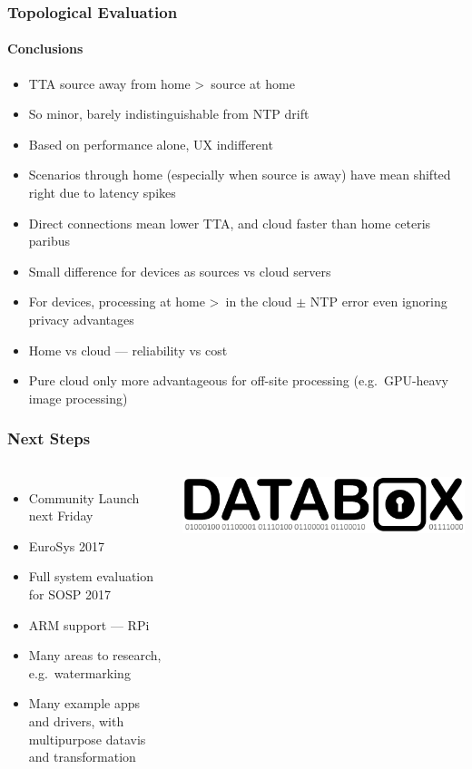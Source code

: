 \documentclass[aspectratio=169]{beamer}
\begin{document}
\begin{frame}
	\frametitle{Topological Evaluation}
	\framesubtitle{Conclusions}

	\begin{itemize}
		\item TTA source away from home \textgreater \ source at home
		\item So minor, barely indistinguishable from NTP drift
		\item Based on performance alone, UX indifferent
		\item Scenarios through home (especially when source is away) have mean shifted right due to latency spikes
		\item Direct connections mean lower TTA, and cloud faster than home ceteris paribus
		\item Small difference for devices as sources vs cloud servers
		\item For devices, processing at home \textgreater \ in the cloud $\pm$ NTP error even ignoring privacy advantages
		\item Home vs cloud --- reliability vs cost
		\item Pure cloud only more advantageous for off-site processing (e.g.\ GPU-heavy image processing)
	\end{itemize}
\end{frame}


\begin{frame}
	\frametitle{Next Steps}

	\begin{columns}[c]
		\begin{itemize}
			\item Community Launch next Friday
			\item EuroSys 2017
			\item Full system evaluation for SOSP 2017
			\item ARM support --- RPi
			\item Many areas to research, e.g.\ watermarking
			\item Many example apps and drivers, with multipurpose datavis and transformation
		\end{itemize}
		\includegraphics[width=\columnwidth]{databox-logo}
	\end{columns}
\end{frame}
\end{document}
